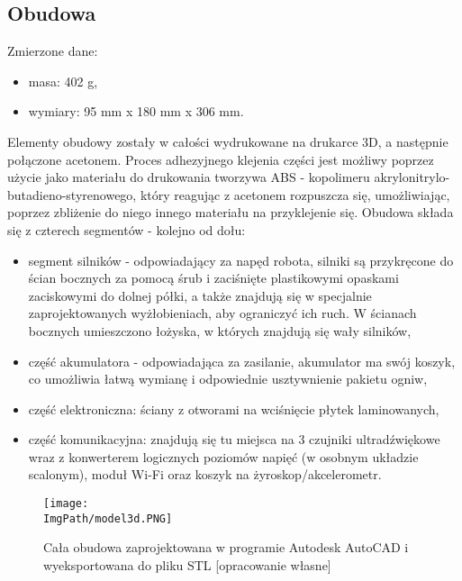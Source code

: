 \documentclass[a4paper,12pt,twoside,openany]{report}
\newcommand{\ImgPath}{.}
\begin{document}
\subsection{Obudowa}

\noindent Zmierzone dane:
\begin{itemize}
\item masa: 402 g,
\item wymiary: 95 mm x 180 mm x 306 mm.
\end{itemize}

Elementy obudowy zostały w całości wydrukowane na drukarce 3D, a następnie połączone acetonem. Proces adhezyjnego klejenia części jest możliwy poprzez użycie jako materiału do drukowania tworzywa ABS - kopolimeru akrylonitrylo-butadieno-styrenowego, który reagując z acetonem rozpuszcza się, umożliwiając, poprzez zbliżenie do niego innego materiału na przyklejenie się. 
\newpage
\noindent Obudowa składa się z czterech segmentów - kolejno od dołu:
\begin{itemize}
\item segment silników - odpowiadający za napęd robota, silniki są przykręcone do ścian bocznych za pomocą śrub i zaciśnięte plastikowymi opaskami zaciskowymi do dolnej półki, a także znajdują się w specjalnie zaprojektowanych wyżłobieniach, aby ograniczyć ich ruch. W ścianach bocznych umieszczono łożyska, w których znajdują się wały silników,
\item część akumulatora - odpowiadająca za zasilanie, akumulator ma swój koszyk, co umożliwia łatwą wymianę i odpowiednie usztywnienie pakietu ogniw,
\item część elektroniczna: ściany z otworami na wciśnięcie płytek laminowanych,
\item część komunikacyjna: znajdują się tu miejsca na 3 czujniki ultradźwiękowe wraz z konwerterem logicznych poziomów napięć (w osobnym układzie scalonym), moduł Wi-Fi oraz koszyk na żyroskop/akcelerometr.
\end{itemize}

\begin{figure}[!htbp]
	\begin{center}
\centering
\texttt{[image: \\ImgPath/model3d.PNG]}
\end{center}
	\caption{Cała obudowa zaprojektowana w programie Autodesk AutoCAD i wyeksportowana do pliku STL [opracowanie własne]}
	\label{model3d}
\end{figure}

\newpage

\end{document}
